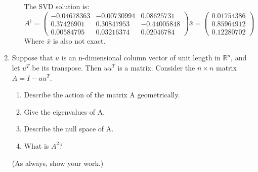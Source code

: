 \documentclass[conference,onecolumn]{IEEEtran}
\begin{document}
\begin{enumerate}[label=\arabic{enumi}.]
\begin{enumerate}
                    The SVD solution is:
                    $$
                        A^{\dagger} =
                        \begin{pmatrix}
                            -0.04678363 & -0.00730994 & 0.08625731  \\
                            0.37426901  & 0.30847953  & -0.44005848 \\
                            0.00584795  & 0.03216374  & 0.02046784
                        \end{pmatrix}
                        \bar{x} =
                        \begin{pmatrix}
                            0.01754386 \\
                            0.85964912 \\
                            0.12280702
                        \end{pmatrix}
                    $$
                    Where $\bar{x}$ is also not exact.
          \end{enumerate}

          \clearpage
    \item Suppose that $u$ is an n-dimensional column vector of unit length in $\mathbb{R}^n$, and let $u^T$ be its transpose.
          Then $uu^T$ is a matrix.
          Consider the $n \times n$ matrix $A = I - uu^T$.
          \begin{enumerate}
              \item Describe the action of the matrix A geometrically.
              \item Give the eigenvalues of A.
              \item Describe the null space of A.
              \item What is $A^2$?
          \end{enumerate}
          (As always, show your work.)


\end{enumerate}
\end{document}
